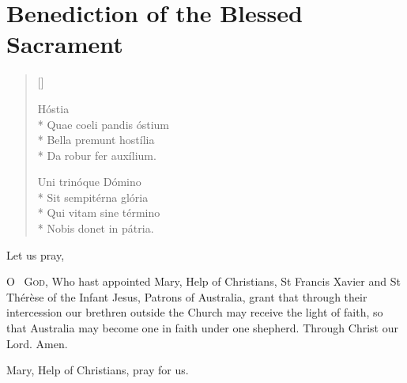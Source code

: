 \def\tabmark{Benediction}

\chapter{Benediction of the Blessed Sacrament}

\label{benediction}



\newHymn


\begin{verse}[\versewidth]

 Hóstia\\*
Quae coeli pandis óstium\\*
Bella premunt hostília\\*
Da robur fer auxílium.

Uni trinóque Dómino\\*
Sit sempitérna glória\\*
Qui vitam sine término\\*
Nobis donet in pátria.

\end{verse}


\newHymn



\newpage


\noindent Let us pray,

\lettrine{O}{~ God,} Who hast appointed Mary, Help of Christians, 
St Francis Xavier and St Thérèse of the Infant Jesus, 
Patrons of Australia, grant that through their intercession 
our brethren outside the Church may receive the light of faith, 
so that Australia may become one in faith under one shepherd.  
Through Christ our Lord.  \Rbar Amen.

Mary, Help of Christians, \Rbar pray for us.

